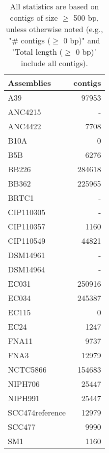 \documentclass[12pt,a4paper]{article}
\begin{document}
\begin{table}[ht]
\begin{center}
\caption{All statistics are based on contigs of size $\geq$ 500 bp, unless otherwise noted (e.g., "\# contigs ($\geq$ 0 bp)" and "Total length ($\geq$ 0 bp)" include all contigs).}
\begin{tabular}{|l*{1}{|r}|}
\hline
Assemblies & contigs \\ \hline
A39 & 97953 \\ \hline
ANC4215 & - \\ \hline
ANC4422 & 7708 \\ \hline
B10A & 0 \\ \hline
B5B & 6276 \\ \hline
BB226 & 284618 \\ \hline
BB362 & 225965 \\ \hline
BRTC1 & - \\ \hline
CIP110305 & - \\ \hline
CIP110357 & 1160 \\ \hline
CIP110549 & 44821 \\ \hline
DSM14961 & - \\ \hline
DSM14964 & - \\ \hline
EC031 & 250916 \\ \hline
EC034 & 245387 \\ \hline
EC115 & 0 \\ \hline
EC24 & 1247 \\ \hline
FNA11 & 9737 \\ \hline
FNA3 & 12979 \\ \hline
NCTC5866 & 154683 \\ \hline
NIPH706 & 25447 \\ \hline
NIPH991 & 25447 \\ \hline
SCC474reference & 12979 \\ \hline
SCC477 & 9990 \\ \hline
SM1 & 1160 \\ \hline
\end{tabular}
\end{center}
\end{table}
\end{document}
